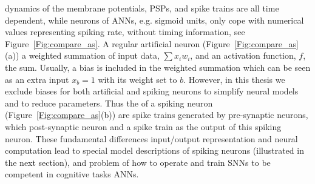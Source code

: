 \DIFdelbegin {}\DIFdelend \DIFaddbegin {}\DIFaddend dynamics of the membrane potentials, PSPs, and spike trains are all time dependent, while \DIFaddbegin {}\DIFaddend neurons of ANNs, e.g. sigmoid units, only cope with numerical values representing spiking rate, without timing information, see Figure~\ref{Fig:compare_as}.
A regular artificial neuron (Figure~\ref{Fig:compare_as}(a)) \DIFdelbegin {}\DIFdelend \DIFaddbegin {}\DIFaddend a weighted summation of input data, $\sum x_i w_i$, and an activation function, $f$, \DIFdelbegin {}\DIFdelend \DIFaddbegin {}\DIFaddend the sum. Usually, a bias is included in the weighted summation which can be seen as an extra input $x_b = 1$ with its weight set to $b$.
However, in this thesis we exclude biases for both artificial and spiking neurons to simplify \DIFaddbegin {}\DIFaddend neural models and to reduce \DIFaddbegin {}\DIFaddend parameters.
Thus the \DIFdelbegin {}\DIFdelend \DIFaddbegin {}\DIFaddend of a spiking neuron (Figure~\ref{Fig:compare_as}(b)) are spike trains generated by pre-synaptic neurons, which \DIFdelbegin {}\DIFdelend \DIFaddbegin {}\DIFaddend post-synaptic neuron and \DIFdelbegin {}\DIFdelend \DIFaddbegin {}\DIFaddend a spike train as the output of this spiking neuron.
These fundamental differences \DIFdelbegin {}\DIFdelend \DIFaddbegin {}\DIFaddend input/output representation and neural computation lead to special model descriptions of spiking neurons (illustrated in the next section), and \DIFdelbegin {}\DIFdelend \DIFaddbegin {}\DIFaddend problem of how to operate and train \DIFdelbegin {}\DIFdelend \DIFaddbegin {}\DIFaddend SNNs to be \DIFaddbegin {}\DIFaddend competent in cognitive tasks \DIFdelbegin {}\DIFdelend \DIFaddbegin {}\DIFaddend ANNs.

